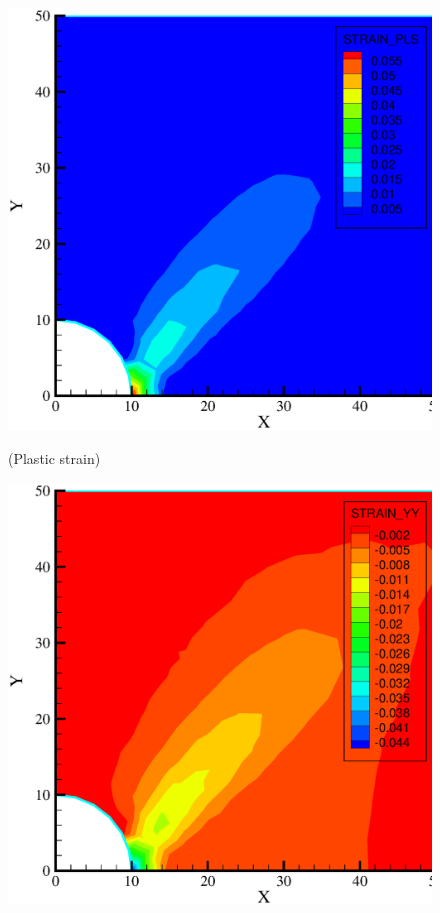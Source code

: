\begin{figure}[!thb]
  \begin{center}
   \begin{minipage}[t]{0.48\textwidth}
     \begin{center}
    \includegraphics[scale=0.28]{PART_II/M/ex1_pls_4.1.eps}
    \centerline{(Plastic strain)}
    \end{center}
   \end{minipage}
   \hspace{0.02\textwidth}
   \begin{minipage}[t]{0.48\textwidth}
    \begin{center}
    \includegraphics[scale=0.28]{PART_II/M/ex1_strain_yy_4.1.eps}\\

\end{center}
\end{minipage}
\end{center}
\end{figure}
